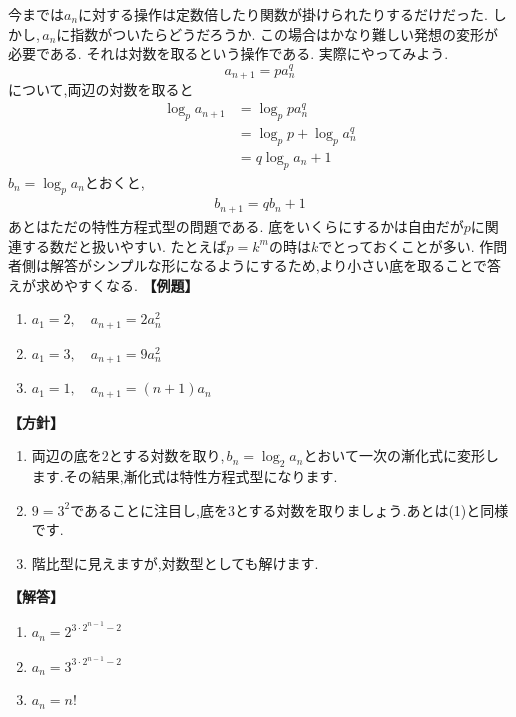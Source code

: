 
今までは$a_n$に対する操作は定数倍したり関数が掛けられたりするだけだった.
しかし,\,$a_n$に指数がついたらどうだろうか.
この場合はかなり難しい発想の変形が必要である.
それは対数を取るという操作である.
実際にやってみよう.
\[
  a_{n+1}=pa_n^q
\]
について,両辺の対数を取ると
\begin{align*}
  \log_p{a_{n+1}} & =\log_p{pa_n^q}          \\
                  & =\log_p{p}+\log_p{a_n^q} \\
                  & =q\log_p{a_n}+1
\end{align*}
$b_n=\log_p{a_n}$とおくと,
\begin{align*}
  b_{n+1}=qb_n+1
\end{align*}
あとはただの特性方程式型の問題である.
底をいくらにするかは自由だが$p$に関連する数だと扱いやすい.
たとえば$p=k^m$の時は$k$でとっておくことが多い.
作問者側は解答がシンプルな形になるようにするため,より小さい底を取ることで答えが求めやすくなる.
\noindent\textbf{【例題】}
\begin{enumerate}[label=(\arabic*),parsep=3pt]
  \item $\displaystyle a_1=2,\quad a_{n+1}=2a_n^2$
  \item $\displaystyle a_1=3,\quad a_{n+1}=9a_n^2$
  \item $\displaystyle a_1=1,\quad a_{n+1}=(n+1)a_n$
\end{enumerate}

\noindent\textbf{【方針】}
\begin{enumerate}[label=(\arabic*),parsep=3pt]
  \item 両辺の底を$2$とする対数を取り,\,$b_n=\log_2a_n$とおいて一次の漸化式に変形します.その結果,漸化式は特性方程式型になります.
  \item $9=3^2$であることに注目し,底を$3$とする対数を取りましょう.あとは(1)と同様です.
  \item 階比型に見えますが,対数型としても解けます.
\end{enumerate}

\noindent\textbf{【解答】}
\begin{enumerate}[label=(\arabic*),parsep=3pt]
  \item $\displaystyle a_n=2^{3\cdot2^{n-1}-2}$
  \item $a_n=3^{3\cdot2^{n-1}-2}$
  \item $a_n=n!$
\end{enumerate}

